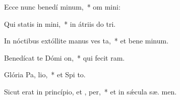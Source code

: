 \item Ecce nunc benedí minum,~* om  mini:
\item Qui statis in  mini,~* in átriis do  tri.
\item In nóctibus extóllite manus ves  ta,~* et bene minum.
\item Benedícat te Dómi  on,~* qui fecit   ram.
\item Glória Pa,  lio,~* et Spi to.
\item Sicut erat in princípio, et ,  per,~* et in sǽcula sæ. men.
